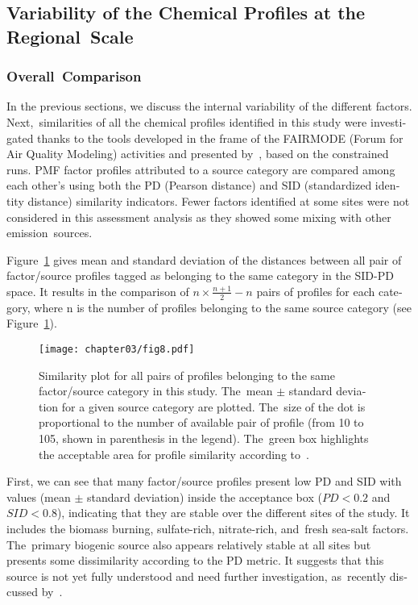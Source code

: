 \begin{otherlanguage}{english}
\subsection{Variability of the Chemical Profiles at the Regional~Scale}%
\label{sub:variability_of_the_chemical_profiles_at_the_regional_scale}

\subsubsection{Overall~Comparison}%
\label{ssub:overall_comparison}

In the previous sections, we discuss  the internal variability of the different factors.
Next,~similarities of all the chemical profiles identified in this study were investigated
thanks to the tools developed in the frame of the FAIRMODE (Forum for Air Quality
Modeling) activities and presented by~\textcite{belisNew2015}, based on the constrained
runs. PMF factor profiles attributed to a source category are compared among each other's
using both the PD (Pearson distance) and SID (standardized identity distance) similarity
indicators. Fewer factors identified at some sites were not considered in this assessment
analysis as they showed some mixing with other emission~sources.

Figure~\ref{fig:fig8} gives mean and standard deviation of the distances between all pair
of factor/source profiles tagged as belonging to the same category in the SID-PD space. It
results in the comparison of $n\times\frac{n+1}{2}-n$ pairs of profiles for each category,
where n is the number of profiles belonging to the same source category (see
Figure~\ref{fig:fig8}).

\begin{figure}[ht]
    \centering
    \texttt{[image: chapter03/fig8.pdf]}
    \caption{
       Similarity plot for all pairs of profiles belonging to the same
        factor/source category in this study. The~mean $\pm$ standard deviation
        for a given source category are plotted. The~size of the dot is
        proportional to the number of available pair of profile (from 10 to 105,
        shown in parenthesis in the legend). The~green box highlights the
        acceptable area for profile similarity according
        to~\textcite{pernigottiDeltaSA2018}.
    }
    \label{fig:fig8}
\end{figure}

First, we can see that many factor/source profiles present low PD and SID with values
(mean $\pm$ standard deviation) inside the acceptance box ($PD<0.2$ and $SID<0.8$),
indicating that they are stable over the different sites of the study.  It includes the
biomass burning, sulfate-rich, nitrate-rich, and~fresh sea-salt factors. The~primary
biogenic source also appears relatively stable at all sites but presents some
dissimilarity according to the PD metric. It suggests that this source is not yet fully
understood and need further investigation, as~recently discussed
by~\textcite{samakePolyols2019}.


\end{otherlanguage}
